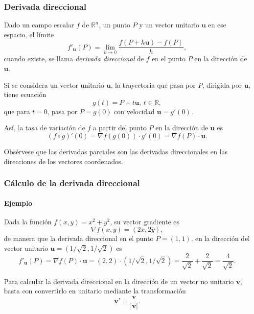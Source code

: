 \begin{frame}
\frametitle{Derivada direccional}
\begin{definicion}
Dado un campo escalar $f$ de $\mathbb{R}^n$, un punto $P$ y un vector unitario $\mathbf{u}$ en ese espacio, el límite
\[
f'_{\mathbf{u}}(P) = \lim_{h\rightarrow 0}\frac{f(P+h\mathbf{u})-f(P)}{h},
\] 
cuando existe, se llama \emph{derivada direccional} de $f$ en el punto $P$ en la dirección de $\mathbf{u}$.
\end{definicion}
Si se considera un vector unitario $\mathbf{u}$, la trayectoria que pasa por $P$, dirigida por $\mathbf{u}$, tiene ecuación
\[
g(t)=P+t\mathbf{u},\ t\in\mathbb{R},
\]
que para $t=0$, pasa por $P=g(0)$ con velocidad $\mathbf{u}=g'(0)$.

Así, la tasa de variación de $f$ a partir del punto $P$ en la dirección de $\mathbf{u}$ es
\[
(f\circ g)'(0) = \nabla f(g(0))\cdot g'(0) = \nabla f(P)\cdot \mathbf{u}.
\]

Obsérvese que las derivadas parciales son las derivadas direccionales en las direcciones de los vectores coordenados. 
\end{frame}


\begin{frame}
\frametitle{Cálculo de la derivada direccional}
\framesubtitle{Ejemplo}
Dada la función $f(x,y) = x^2+y^2$, su vector gradiente es
\[
\nabla f(x,y) = (2x,2y),
\]
de manera que la derivada direccional en el punto $P=(1,1)$, en la dirección del vector unitario $\mathbf{u}=(1/\sqrt{2},1/\sqrt{2})$ es
\[
f'_{\mathbf{u}}(P) = \nabla f(P)\cdot \mathbf{u} = (2,2)\cdot(1/\sqrt{2},1/\sqrt{2}) = \frac{2}{\sqrt{2}}+\frac{2}{\sqrt{2}} = \frac{4}{\sqrt{2}}.
\]

Para calcular la derivada direccional en la dirección de un vector no unitario $\mathbf{v}$, basta con convertirlo en unitario mediante la transformación
\[
\mathbf{v'}=\frac{\mathbf{v}}{|\mathbf{v}|}.
\] 
\end{frame}


